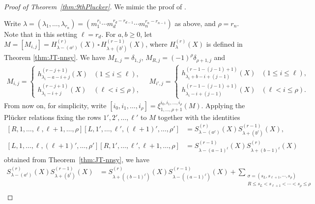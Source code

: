\documentclass[12pt]{amsart}%
\theoremstyle{definition}
\begin{document}
\begin{proof}[Proof of Theorem~\ref{thm:9thPlucker}]
We mimic the proof of \cite[Theorem 4.2]{k01}.

Write $\lambda=(\lambda_1,\ldots,\lambda_{r_n})=(m_1^{r_1}\cdots m_d^{r_d-r_{d-1}}\cdots m_n^{r_n-r_{n-1}})$ as above, and $\rho=r_n$.
Note that in this setting $\ell=r_d$.
For $a,b\ge 0$, 
let $M=[M_{i,j}]=H^{(r)}_{\lambda-(a^{\ell})}(X)\,\square\,H^{(r-1)}_{\lambda+(b^{\ell})}(X)$, where $H^{(r)}_{\lambda}(X)$ is defined in Theorem \ref{thm:JT-nnsy}.
We have 
$M_{L,j}=\delta_{1,j}$,
$M_{R,j}=(-1)^{\rho}\delta_{\rho+1,j}$ and 
\begin{align*}
M_{i,j}
=
\begin{cases}
h_{\lambda_i-a-i+j}^{(r-j+1)}(X) & (1\le i\le \ell),\\
h_{\lambda_i-i+j}^{(r-j+1)}(X) & (\ell< i\le {\rho}),
\end{cases}
\quad 
M_{i',j}
=
\begin{cases}
h_{\lambda_i+b-i+(j-1)}^{(r-1-(j-1)+1)}(X) & (1\le i\le \ell),\\
h_{\lambda_i-i+(j-1)}^{(r-1-(j-1)+1)}(X) & (\ell< i\le {\rho}).
\end{cases}
\end{align*}
From now on, for simplicity, write 
$[i_0,i_1,\ldots,i_{\rho}]=\xi^{i_0,i_1,\ldots,i_{\rho}}_{1,\ldots,\rho+1}(M)$.
Applying the Pl\"{u}cker relations fixing the rows $1',2',\ldots,\ell'$ to $M$
together with the identities  
\begin{align*}
[R,1,\ldots ,\ell,\ell+1,\ldots,{\rho}]
[L,1',\ldots ,\ell',(\ell+1)',\ldots,\rho']
&=S_{\lambda-(a^{\ell})}^{(r)}(X)
S_{\lambda+(b^{\ell})}^{(r-1)}(X),\\
[L,1,\ldots,\ell,(\ell+1)',\ldots,\rho']
[R,1',\ldots ,\ell',\ell+1,\ldots,\rho]
&=S_{\lambda-(a-1)^{\ell}}^{(r-1)}(X)
S_{\lambda+(b-1)^{\ell}}^{(r)}(X)
\end{align*}
obtained from Theorem~\ref{thm:JT-nnsy}, 
we have  
\begin{align}
\label{for:Plucker first step}
 S_{\lambda-(a^{\ell})}^{(r)}(X)
S_{\lambda+(b^{\ell})}^{(r-1)}(X) 
&=S_{\lambda+((b-1)^{\ell})}^{(r)}(X)
S_{\lambda-((a-1)^{\ell})}^{(r-1)}(X)
+\sum_{\substack{\sigma=(s_L,s_{\ell+1},\cdots,s_{\rho}) \\
R\le s_L<s_{\ell+1}<\cdots<s_{\rho}\le \rho \\
}}
\end{align}
\end{proof}
\end{document}
